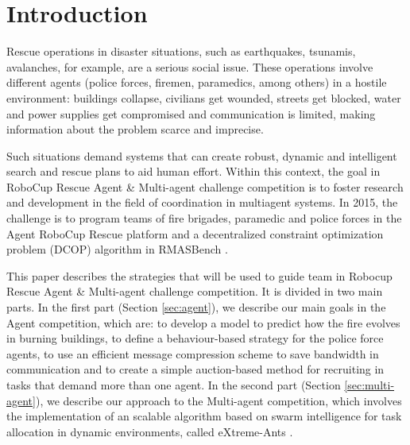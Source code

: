 \section{Introduction}
\label{sec:intro}

Rescue operations in disaster situations, such as earthquakes, tsunamis, avalanches, for example, are a serious social issue. These operations involve different agents (police forces, firemen, paramedics, among others) in a hostile environment: buildings collapse, civilians get wounded, streets get blocked, water and power supplies get compromised and communication is limited, making information about the problem scarce and imprecise.

Such situations demand systems that can create robust, dynamic and intelligent search and rescue plans to aid human effort. Within this context, the goal in RoboCup Rescue Agent \& Multi-agent challenge competition is to foster research and development in the field of coordination in multiagent systems. In 2015, the challenge is to program teams of fire brigades, paramedic and police forces in the Agent RoboCup Rescue platform \citep{Kitano2000} and a decentralized constraint optimization problem (DCOP) algorithm in RMASBench \citep{Kleiner+2013}. 


This paper describes the strategies that will be used to guide \teamname team in  Robocup Rescue Agent \& Multi-agent challenge competition. It is divided in two main parts. In the first part (Section \ref{sec:agent}), we describe our main goals in the Agent competition, which are: to develop a model to predict how the fire evolves in burning buildings, to define a behaviour-based strategy for the police force agents, to use an efficient message compression scheme to save bandwidth in communication and to create a simple auction-based method for recruiting in tasks that demand more than one agent. In the second part (Section \ref{sec:multi-agent}), we describe our approach to the Multi-agent competition, which involves the implementation of an scalable algorithm based on swarm intelligence for task allocation in dynamic environments, called eXtreme-Ants \citep{Santos&Bazzan2009optmas}.
